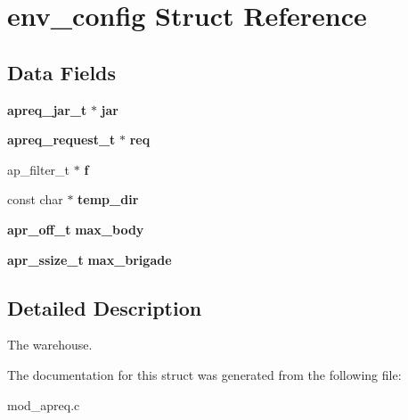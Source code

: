 \section{env\_\-config  Struct Reference}
\label{structenv__config}
\subsection*{Data Fields}
\begin{CompactItemize}
\item 
{}
{\bf apreq\_\-jar\_\-t} $\ast$ {\bf jar}\label{structenv__config_m0}

\item 
{}
{\bf apreq\_\-request\_\-t} $\ast$ {\bf req}\label{structenv__config_m1}

\item 
{}
ap\_\-filter\_\-t $\ast$ {\bf f}\label{structenv__config_m2}

\item 
{}
const char $\ast$ {\bf temp\_\-dir}\label{structenv__config_m3}

\item 
{}
{\bf apr\_\-off\_\-t} {\bf max\_\-body}\label{structenv__config_m4}

\item 
{}
{\bf apr\_\-ssize\_\-t} {\bf max\_\-brigade}\label{structenv__config_m5}

\end{CompactItemize}


\subsection{Detailed Description}
The warehouse. 



The documentation for this struct was generated from the following file:\begin{CompactItemize}
\item 
mod\_\-apreq.c\end{CompactItemize}
